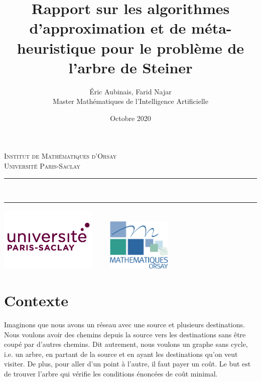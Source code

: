 \documentclass[11pt,french]{report}
\newcommand{\HRule}{\rule{\linewidth}{0.5mm}}
\begin{document}
	\title{Rapport sur les algorithmes d'approximation et de méta-heuristique pour le problème de l'arbre de Steiner\\}
	\author{
		Éric Aubinais, Farid Najar\\[0.2cm]
		Master Mathématiques de l'Intelligence Artificielle }
	\date{Octobre 2020}
	\makeatletter
	\begin{titlepage}
		\centering
		\textsc{\LARGE Institut de Mathématiques d'Orsay \\ Université Paris-Saclay}\\[4cm]
		\HRule \\
		{ \huge \bfseries \@title[2cm] }
		\begin{Large}
			\@author
		\end{Large}
		\HRule
		\vfill
		\includegraphics[width=0.35\textwidth]{paris-saclay.png}
		\hfill
		\includegraphics[width=0.35\textwidth, height=2.5cm]{imo.png}
		\pagebreak
		\tableofcontents
		\pagebreak
	\end{titlepage}

	\section{Contexte\label{Contexte}}
	Imaginons que nous avons un réseau avec une source et plusieurs destinations. Nous voulons avoir des chemins depuis la source vers les destinations sans être coupé par d'autres chemins. Dit autrement, nous voulons un graphe sans cycle, i.e. un arbre, en partant de la source et en ayant les destinations qu'on veut visiter. De plus, pour aller d'un point à l'autre, il faut payer un coût. Le but est de trouver l'arbre qui vérifie les conditions énoncées de coût minimal.
\end{document}
